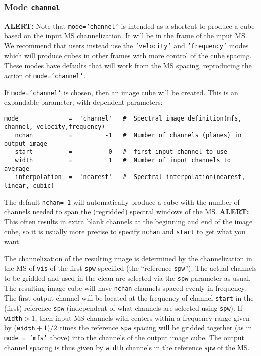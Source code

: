 \subsubsection{Mode {\tt channel} }
\label{section:im.pars.mode.channel}

{\bf ALERT:} Note that {\tt mode='channel'} is intended as a shortcut
to produce a cube based on the input MS channelization.  It will be in
the frame of the input MS.  We recommend that users instead use the
{\tt 'velocity'} and {\tt 'frequency'} modes which will produce cubes
in other frames with more control of the cube spacing.  These modes
have defaults that will work from the MS spacing, reproducing the
action of {\tt mode='channel'}.

If {\tt mode='channel'} is chosen, then an image cube will be
created. This is an expandable parameter, with dependent parameters:
\small
\begin{verbatim}
mode              =  'channel'   #  Spectral image definition(mfs, channel, velocity,frequency)
   nchan          =         -1   #  Number of channels (planes) in output image
   start          =          0   #  first input channel to use
   width          =          1   #  Number of input channels to average
   interpolation  =  'nearest'   #  Spectral interpolation(nearest, linear, cubic)
\end{verbatim}
\normalsize
The default {\tt nchan=-1} will automatically produce a cube with the
number of channels needed to span the (regridded) spectral windows of
the MS.  {\bf ALERT:} This often results in extra blank channels at the
beginning and end of the image cube, so it is usually more precise to
specify {\tt nchan} and {\tt start} to get what you want.  

The channelization of the resulting image is determined by the 
channelization in the MS of {\tt vis} of the first {\tt spw} 
specified (the ``reference {\tt spw}''). The actual channels to
be gridded and used in the clean are selected via the {\tt spw} 
parameter as usual. 
The resulting image cube will have {\tt nchan} channels spaced
evenly in frequency.  The
first output channel will be located at the frequency of channel 
{\tt start} in the (first) reference {\tt spw} (independent of what
channels are selected using {\tt spw}).  If {\tt width}$ > 1$,
then input MS channels with centers within a frequency range given by 
$({\tt width}+1)/2$ times the reference {\tt spw} spacing
will be gridded together (as in {\tt mode = 'mfs'} above)
into the channels of the output image cube.  
The output channel 
spacing is thus given by {\tt width} channels in the reference {\tt spw}
of the MS.  
  
